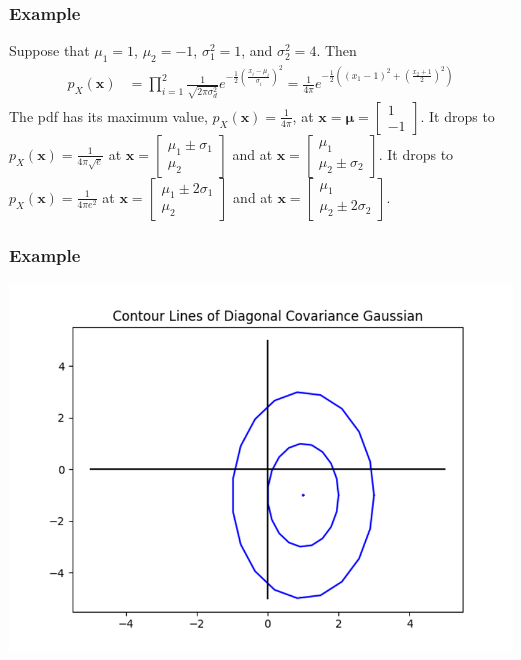 \documentclass{beamer}
\begin{document}
\begin{frame}
  \frametitle{Example}

  Suppose that $\mu_1=1$, $\mu_2=-1$, $\sigma_1^2=1$, and
  $\sigma_2^2=4$. Then
  \begin{align*}
    p_X(\mathbf{x})
    &=
    \prod_{i=1}^2\frac{1}{\sqrt{2\pi\sigma_d^2}}e^{-\frac{1}{2}\left(\frac{x_i-\mu_i}{\sigma_i}\right)^2}
    =\frac{1}{4\pi}e^{-\frac{1}{2}\left((x_1-1)^2+\left(\frac{x_2+1}{2}\right)^2\right)}
  \end{align*}
  The pdf has its maximum value, $p_X(\mathbf{x})=\frac{1}{4\pi}$, at
  $\mathbf{x}=\bm{\mu}=\left[\begin{array}{c}1\\-1\end{array}\right]$.
  It drops to $p_X(\mathbf{x})=\frac{1}{4\pi\sqrt{e}}$ at 
  $\mathbf{x}=\left[\begin{array}{c}\mu_1\pm\sigma_1\\\mu_2\end{array}\right]$ and at
  $\mathbf{x}=\left[\begin{array}{c}\mu_1\\\mu_2\pm\sigma_2\end{array}\right]$.
  It drops to $p_X(\mathbf{x})=\frac{1}{4\pi e^2}$ at 
  $\mathbf{x}=\left[\begin{array}{c}\mu_1\pm2\sigma_1\\\mu_2\end{array}\right]$ and at
  $\mathbf{x}=\left[\begin{array}{c}\mu_1\\\mu_2\pm 2\sigma_2\end{array}\right]$.
\end{frame}

\begin{frame}
  \frametitle{Example}
  \centerline{\includegraphics[height=0.8\textheight]{figs/contours_diagonal.png}}
\end{frame}
\end{document}
